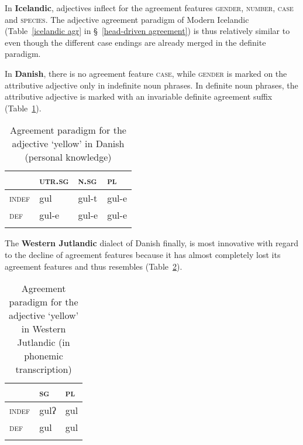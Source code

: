 In \textbf{Icelandic}, adjectives inflect for the agreement features \textsc{gender}, \textsc{number}, \textsc{case} and \textsc{species}. The adjective agreement paradigm of Modern Icelandic (Table~\ref{icelandic agr} in \S~\ref{head-driven agreement}) is thus relatively similar to  even though the different case endings are already merged in the definite paradigm.

In \textbf{Danish},\label{danish synchr} there is no agreement feature \textsc{case}, while \textsc{gender} is marked on the attributive adjective only in indefinite noun phrases. In definite noun phrases, the attributive adjective is marked with an invariable definite agreement suffix (Table~\ref{danish agr paradigm}).
\begin{table}
\begin{tabular}{l l l l}
\lsptoprule
		& \textsc{utr.sg}	&\textsc{n.sg}	&\textsc{pl}\\
\midrule
\textsc{indef}	&gul	 	&gul-t		&gul-e\\

\textsc{def}	&gul-e	&gul-e		&gul-e\\
\lspbottomrule
\end{tabular}
\caption[Adjective paradigm for Danish]{Agreement paradigm for the adjective ‘yellow’ in Danish (personal knowledge)}
\label{danish agr paradigm}
\end{table}
The \textbf{Western Jutlandic} dialect of Danish finally, is most innovative with regard to the decline of agreement features because it has almost completely lost its agreement features and thus resembles  (Table~\ref{jutl agr paradigm}).
\begin{table}
\begin{tabular}{l l l}
\lsptoprule		& \textsc{sg}	&\textsc{pl}\\
\midrule
\textsc{indef}	& gulʔ	 	&gul\\

\textsc{def}	&gul			&gul\\
\lspbottomrule
\end{tabular}
\caption[Adjective paradigm for W-Jutlandic]{Agreement paradigm for the adjective ‘yellow’ in Western Jutlandic (in phonemic transcription) \citep{ringgaard1960}}
\label{jutl agr paradigm}
\end{table}

